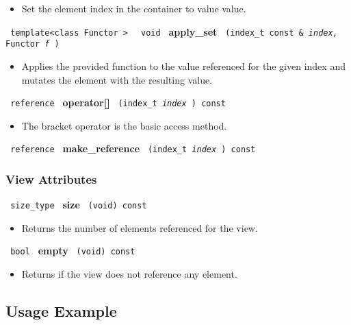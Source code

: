 \begin{itemize}
\item
Set the element index in the container to value value.
\end{itemize}

\noindent
\texttt{%
template<class Functor >
}
\texttt{%
void
}
\newline
\textbf{apply\_set}%
\texttt{%
(index\_t const \&
\textit{index,}%
Functor
\textit{f}%
)
}

\begin{itemize}
\item
Applies the provided function to the value referenced for the given index and mutates the element with the resulting value.
\end{itemize}

\noindent
\texttt{%
reference
}
\newline
\textbf{operator[]}%
\texttt{%
(index\_t
\textit{index}%
) const
}

\begin{itemize}
\item
The bracket operator is the basic access method.
\end{itemize}

\noindent
\texttt{%
reference
}
\newline
\textbf{make\_reference}%
\texttt{%
(index\_t
\textit{index}%
) const
}

\subsubsection{ View Attributes}

\noindent
\texttt{%
size\_type
}
\newline
\textbf{size}%
\texttt{%
(void) const
}

\begin{itemize}
\item
Returns the number of elements referenced for the view.
\end{itemize}

\noindent
\texttt{%
bool
}
\newline
\textbf{empty}%
\texttt{%
(void) const
}

\begin{itemize}
\item
Returns if the view does not reference any element.
\end{itemize}

\subsection{Usage Example} \label{sec-map-vw-use}

